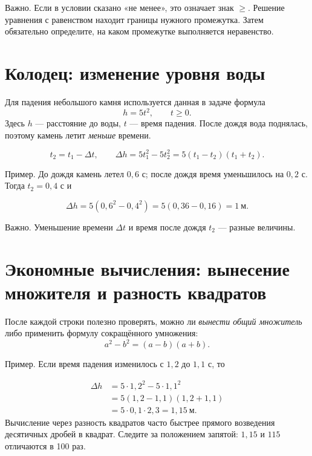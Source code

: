 \documentclass[a4paper,11pt]{article}
\newcommand{\keyword}[1]{\textcolor{darkaccent}{#1}}
\newcommand{\example}[1]{\par\noindent\keyword{Пример.} #1\par}
\newcommand{\caution}[1]{\par\noindent\textcolor{darkaccent}{Важно.} #1\par}
\begin{document}
\caution{Если в условии сказано «не менее», это означает знак $\ge$. Решение уравнения с равенством находит границы нужного промежутка. Затем обязательно определите, на каком промежутке выполняется неравенство.}

\section{Колодец: изменение уровня воды}
Для падения небольшого камня используется данная в задаче формула
\[
 h=5t^2,\qquad t\ge0.
\]
Здесь $h$ --- расстояние до воды, $t$ --- время падения. После дождя вода поднялась, поэтому камень летит \emph{меньше} времени.

\begin{center}
\end{center}
\[
 t_2=t_1-\Delta t,\qquad
 \boxed{\Delta h=5t_1^2-5t_2^2=5(t_1-t_2)(t_1+t_2).}
\]
\example{До дождя камень летел $0{,}6$ с; после дождя время уменьшилось на $0{,}2$ с. Тогда $t_2=0{,}4$ с и}
\[
 \Delta h=5(0{,}6^2-0{,}4^2)=5(0{,}36-0{,}16)=\boxed{1\ \text{м}}.
\]
\caution{Уменьшение времени $\Delta t$ и время после дождя $t_2$ --- разные величины.}
\clearpage

\section{Экономные вычисления: вынесение множителя и разность квадратов}
После каждой строки полезно проверять, можно ли \emph{вынести общий множитель} либо применить формулу сокращённого умножения:
\[
 a^2-b^2=(a-b)(a+b).
\]
\example{Если время падения изменилось с $1{,}2$ до $1{,}1$ с, то}
\[
\begin{aligned}
\Delta h&=5\cdot1{,}2^2-5\cdot1{,}1^2\\
&=5(1{,}2-1{,}1)(1{,}2+1{,}1)\\
&=5\cdot0{,}1\cdot2{,}3=\boxed{1{,}15\ \text{м}}.
\end{aligned}
\]
Вычисление через разность квадратов часто быстрее прямого возведения десятичных дробей в квадрат. Следите за положением запятой: $1{,}15$ и $115$ отличаются в 100 раз.
\end{document}
